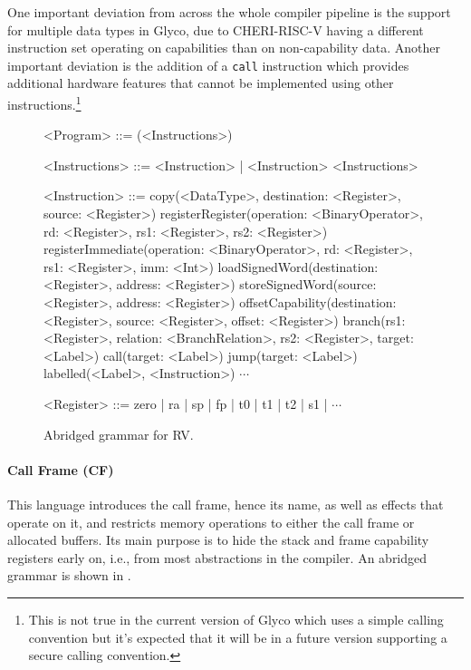 \documentclass[main.tex]{subfiles}
\begin{document}
One important deviation from \cite{compcourse} across the whole compiler pipeline is the support for multiple data types in Glyco, due to CHERI-RISC-V having a different instruction set operating on capabilities than on non-capability data. Another important deviation is the addition of a \texttt{call} instruction which provides additional hardware features that cannot be implemented using other instructions.\footnote{This is not true in the current version of Glyco which uses a simple calling convention but it's expected that it will be in a future version supporting a secure calling convention.}

\begin{figure}[ht]
	\begin{grammar}
		
		<Program> ::= (<Instructions>)
		
		<Instructions> ::= <Instruction> | <Instruction> <Instructions>
		
		<Instruction> ::= copy(<DataType>, destination: <Register>, source: <Register>)
			\alt registerRegister(operation: <BinaryOperator>, rd: <Register>, rs1: <Register>, rs2: <Register>)
			\alt registerImmediate(operation: <BinaryOperator>, rd: <Register>, rs1: <Register>, imm: <Int>)
			\alt loadSignedWord(destination: <Register>, address: <Register>)
			\alt storeSignedWord(source: <Register>, address: <Register>)
			\alt offsetCapability(destination: <Register>, source: <Register>, offset: <Register>)
			\alt branch(rs1: <Register>, relation: <BranchRelation>, rs2: <Register>, target: <Label>)
			\alt call(target: <Label>)
			\alt jump(target: <Label>)
			\alt labelled(<Label>, <Instruction>)
			\alt $\cdots$
			
		<Register> ::= zero | ra | sp | fp | t0 | t1 | t2 | s1 | $\cdots$
		
	\end{grammar}
	\caption{Abridged grammar for RV.}
	\label{bnf:rv}
\end{figure}

\paragraph{Call Frame (CF)} This language introduces the call frame, hence its name, as well as effects that operate on it, and restricts memory operations to either the call frame or allocated buffers. Its main purpose is to hide the stack and frame capability registers early on, i.e., from most abstractions in the compiler. An abridged grammar is shown in .
\end{document}
